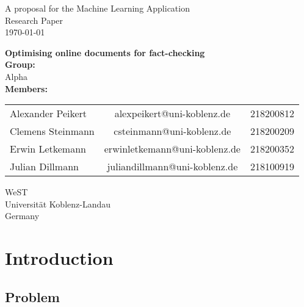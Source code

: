 \documentclass[10pt]{article}
\begin{document}
\begin{titlepage}
\begin{center}

A proposal for the Machine Learning Application\\
Research Paper\\
\vspace{4mm}
\today
\vspace{4mm}
\end{center}
\begin{center}
\textbf{\Large Optimising online documents for fact-checking}\\
\vspace{15mm}
\textbf{Group:}\\
\vspace{2mm}
Alpha \\
\vspace{15mm}
\textbf {Members:}\\
\vspace{2mm}

\begin{tabular}{ l c r }
  Alexander Peikert & alexpeikert@uni-koblenz.de & 218200812 \\
  Clemens Steinmann & csteinmann@uni-koblenz.de & 218200209 \\
  Erwin Letkemann & erwinletkemann@uni-koblenz.de & 218200352 \\
  Julian Dillmann & juliandillmann@uni-koblenz.de & 218100919 \\
\end{tabular}
\end{center}
\vfill
\begin{center}
\vspace{8mm}
WeST \\
Universität Koblenz-Landau \\
Germany \\
\vspace{2mm}
\end{center}
\clearpage
\end{titlepage}


\section{Introduction}
\subsection{Problem}
\end{document}
